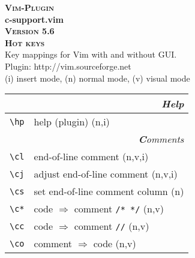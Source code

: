 \documentclass[oneside,10pt,landscape,DIV16]{scrartcl}
\newcommand{\Pluginversion}{5.6}
\begin{document}
%

\begin{multicols}{3}
%
\begin{center}
\textbf{\textsc{\small{Vim-Plugin}}}\\
\textbf{\LARGE{c-support.vim}}\\
\textbf{\textsc{\small{Version \Pluginversion}}}\\
\textbf{\textsc{\Huge{Hot keys}}}\\ 
Key mappings for Vim with and without GUI.\\
Plugin: http://vim.sourceforge.net\\
\vspace{2.0mm}
{\normalsize (i)} insert mode, {\normalsize (n)} normal mode, {\normalsize (v)} visual mode\\
\vspace{3.0mm}
%
\begin{tabular}[]{|p{13mm}|p{56mm}|}
\hline 
\multicolumn{2}{|r|}{\textsl{\textbf{H}elp}}\\
\hline \verb'\hp'   & help (plugin) \hfill (n,i)\\
\hline 
\hline
\multicolumn{2}{|r|}{\textsl{\textbf{C}omments}} \\
\hline \verb'\cl' & end-of-line comment                     \hfill (n,v,i)\\
\hline \verb'\cj' & adjust end-of-line comment              \hfill (n,v,i)\\
\hline \verb'\cs' & set end-of-line comment column          \hfill (n)    \\
\hline \verb'\c*' & code $\Rightarrow$ comment \verb'/* */' \hfill (n,v)  \\
\hline \verb'\cc' & code $\Rightarrow$ comment \verb'//'    \hfill (n,v)  \\
\hline \verb'\co' & comment $\Rightarrow$ code              \hfill (n,v)  \\


\end{tabular}
\end{center}
\end{multicols}
\end{document}
